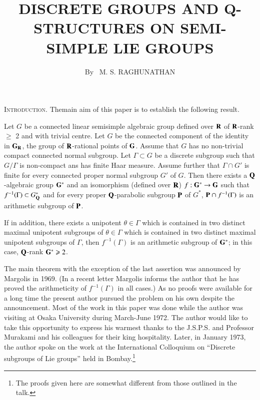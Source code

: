 
\title{DISCRETE GROUPS AND Q-STRUCTURES ON SEMI-SIMPLE LIE GROUPS}

\author{By~ M. S. RAGHUNATHAN}

\date{}
\maketitle


\setcounter{pageoriginal}{224}

\noindent
\textsc{Introduction.} The\pageoriginale main aim of this paper is to establish the following result.

\begin{maintheorem*}
Let $G$ be a connected linear semisimple algebraic group defined over $\mathbf{R}$ of $\mathbf{R}$-rank $\geqslant$ 2 and with trivial centre. Let $G$ be the connected component of the identity in $\mathbf{G}_{\mathbf{R}}$, the group of $\mathbf{R}$-rational points of $\mathbf{G}$. Assume that $G$ has no non-trivial compact connected normal subgroup. Let $\Gamma \subset G$ be a discrete subgroup such that $G/\Gamma$ is non-compact ans has finite Haar measure. Assume further that $\Gamma \cap G'$ is finite for every connected proper normal subgroup $G'$ of $G$. Then there exists a $\mathbf{Q}$-algebraic group $\mathbf{G}^\ast$ and an isomorphism (defined over $\mathbf{R}$)  $f: \mathbf{G}^\ast \to \mathbf{G}$ such that $f^{-1} (\Gamma) \subset G^\ast_{\mathbf{Q}}$ and for every proper $\mathbf{Q}$-parabolic subgroup $\mathbf{P}$ of $G^\ast$, $\mathbf{P} \cap f^{-1} (\Gamma)$ is an arithmetic subgroup of $\mathbf{P}$.

If in addition, there exists a unipotent $\theta \in \Gamma$ which is contained in two distinct maximal unipotent subgroups of $\theta \in \Gamma$ which is contained in two distinct maximal unipotent subgroups of $\Gamma$, then $f^{-1}(\Gamma)$ is an arithmetic subgroup of $\mathbf{G}^\ast$; in this case, $\mathbf{Q}$-rank $\mathbf{G}^\ast \geqslant 2$.
\end{maintheorem*}

The main theorem with the exception of the last assertion was announced by Margolis \cite{art9-key1} in 1969. (In a recent letter Margolis informs the author that he has proved the arithmeticity of $f^{-1}(\Gamma)$ in all cases.) As no proofs were available for a long time the present author pursued the problem on his own despite the announcement. Most of the work in this paper was done while the author was visiting at Osaka University during March-June 1972. The author would like to take this opportunity to express his warmest thanks to the J.S.P.S. and Professor Murakami and his colleagues for their king hospitality. Later, in January 1973, the author spoke on the work at the International Colloquium on ``Discrete subgroups of Lie groups'' held in Bombay.\footnote{The proofs given here are somewhat different from those outlined in the talk.}

